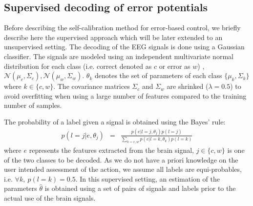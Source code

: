 
 
\subsection{Supervised decoding of error potentials}

Before describing the self-calibration method for error-based control, we briefly describe here the supervised approach \cite{chavarriaga2010learning, iturrate13} which will be later extended to an unsupervised setting.
%
The decoding of the EEG signals is done using a Gaussian classifier.  The signals are modeled using an independent multivariate normal distribution for each class (i.e. correct denoted as $c$ or error as $w$) \cite{lotte2007review,blankertz2010single}, $\mathcal{N}(\mu_c, \Sigma_c), \mathcal{N}(\mu_w, \Sigma_w)$.  $\theta_k$ denotes  the set of parameters of each class  $\{\mu_k, \Sigma_k\}$ where $k\in\{c,w\}$.
%
The covariance matrices $\Sigma_c$ and $\Sigma_w$ are shrinked  ($\lambda = 0.5$) to avoid overfitting when using a large number of features compared to the training number of samples\cite{ledoit2004honey}. 

The probability of a label given a signal is obtained using the Bayes' rule:
%
\begin{eqnarray}
    p(l = j|e,\theta_j) &=& \frac{p(e|l = j, \theta_j)p(l = j)}{\sum_{k = c,w}{p(e|l = k,\theta_k)p(l = k)}}
\end{eqnarray}
where $e$ represents the features extracted from the brain signal, $j\in\{c,w\}$ is one of the two classes to be decoded.
%
As we do not have a priori knowledge on the user intended assessment of the action, we assume all labels are equi-probables, i.e. $\forall k,~p(l = k) = 0.5$. 
%
In this supervised setting, an estimation of the parameters $\hat{\theta}$ is obtained using a set of pairs of signals and labels prior to the actual use of the brain signals. 

